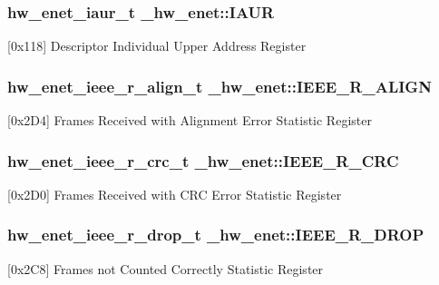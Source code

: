 \subsubsection[{\texorpdfstring{I\+A\+UR}{IAUR}}]{ {\bf hw\+\_\+enet\+\_\+iaur\+\_\+t} \+\_\+hw\+\_\+enet\+::\+I\+A\+UR}\hypertarget{struct__hw__enet_a4d631fd1991c4a341282cecf490eaaf7}{}\label{struct__hw__enet_a4d631fd1991c4a341282cecf490eaaf7}
\mbox{[}0x118\mbox{]} Descriptor Individual Upper Address Register 
\subsubsection[{\texorpdfstring{I\+E\+E\+E\+\_\+\+R\+\_\+\+A\+L\+I\+GN}{IEEE_R_ALIGN}}]{ {\bf hw\+\_\+enet\+\_\+ieee\+\_\+r\+\_\+align\+\_\+t} \+\_\+hw\+\_\+enet\+::\+I\+E\+E\+E\+\_\+\+R\+\_\+\+A\+L\+I\+GN}\hypertarget{struct__hw__enet_ad6b480f2330bf1c87d6c57a5a01758f7}{}\label{struct__hw__enet_ad6b480f2330bf1c87d6c57a5a01758f7}
\mbox{[}0x2\+D4\mbox{]} Frames Received with Alignment Error Statistic Register 
\subsubsection[{\texorpdfstring{I\+E\+E\+E\+\_\+\+R\+\_\+\+C\+RC}{IEEE_R_CRC}}]{ {\bf hw\+\_\+enet\+\_\+ieee\+\_\+r\+\_\+crc\+\_\+t} \+\_\+hw\+\_\+enet\+::\+I\+E\+E\+E\+\_\+\+R\+\_\+\+C\+RC}\hypertarget{struct__hw__enet_a855e7a3efeb835e5e6ccee406b2e17a0}{}\label{struct__hw__enet_a855e7a3efeb835e5e6ccee406b2e17a0}
\mbox{[}0x2\+D0\mbox{]} Frames Received with C\+RC Error Statistic Register 
\subsubsection[{\texorpdfstring{I\+E\+E\+E\+\_\+\+R\+\_\+\+D\+R\+OP}{IEEE_R_DROP}}]{ {\bf hw\+\_\+enet\+\_\+ieee\+\_\+r\+\_\+drop\+\_\+t} \+\_\+hw\+\_\+enet\+::\+I\+E\+E\+E\+\_\+\+R\+\_\+\+D\+R\+OP}\hypertarget{struct__hw__enet_abcffb3a3e64e110c1e1780c861956c5f}{}\label{struct__hw__enet_abcffb3a3e64e110c1e1780c861956c5f}
\mbox{[}0x2\+C8\mbox{]} Frames not Counted Correctly Statistic Register 

